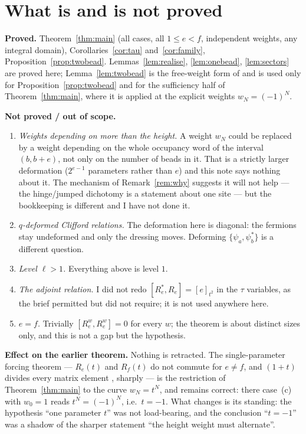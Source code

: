 \documentclass[11pt]{article}
\theoremstyle{definition}
\begin{document}
\section{What is and is not proved}\label{sec:gaps}

\textbf{Proved.}  Theorem~\ref{thm:main} (all cases, all $1\le e<f$, independent weights,
any integral domain), Corollaries~\ref{cor:tau} and~\ref{cor:family},
Proposition~\ref{prop:twobead}.  Lemmas~\ref{lem:realise}, \ref{lem:onebead},
\ref{lem:sectors} are proved here; Lemma~\ref{lem:twobead} is the free-weight form of
\cite[Thm.~5(2)]{Clio0907} and is used only for Proposition~\ref{prop:twobead} and for
the sufficiency half of Theorem~\ref{thm:main}, where it is applied at the explicit
weights $w_N=(-1)^N$.

\textbf{Not proved / out of scope.}
\begin{enumerate}
\item \emph{Weights depending on more than the height.}  A weight $w_{N}$ could be
  replaced by a weight depending on the whole occupancy word of the interval
  $(b,b+e)$, not only on the number of beads in it.  That is a strictly larger
  deformation ($2^{e-1}$ parameters rather than $e$) and this note says nothing about it.
  The mechanism of Remark~\ref{rem:why} suggests it will not help --- the hinge/jumped
  dichotomy is a statement about one site --- but the bookkeeping is different and I have
  not done it.
\item \emph{$q$-deformed Clifford relations.}  The deformation here is diagonal: the
  fermions stay undeformed and only the dressing moves.  Deforming
  $\{\psi_a,\psi_b^{*}\}$ is a different question.
\item \emph{Level $\ell>1$.}  Everything above is level $1$.
\item \emph{The adjoint relation.}  I did not redo $[R_e^{*},R_e]=[e]_{t^2}$ in the
  $\tau$ variables, as the brief permitted but did not require; it is not used anywhere
  here.
\item \emph{$e=f$.}  Trivially $[R_e^w,R_e^w]=0$ for every $w$; the theorem is about
  distinct sizes only, and this is not a gap but the hypothesis.
\end{enumerate}

\textbf{Effect on the earlier theorem.}  Nothing is retracted.  The single-parameter
forcing theorem --- $R_e(t)$ and $R_f(t)$ do not commute for $e\ne f$, and $(1+t)$
divides every matrix element \cite[Cor.~11]{Clio0906}, sharply \cite[Cor.~7]{Clio0907}
--- is the restriction of Theorem~\ref{thm:main} to the curve $w_N=t^N$, and remains
correct: there case~(c) with $w_0=1$ reads $t^N=(-1)^N$, i.e.\ $t=-1$.  What changes is its standing: the hypothesis
``one parameter $t$'' was not load-bearing, and the conclusion ``$t=-1$'' was a shadow of
the sharper statement ``the height weight must alternate''.
\end{document}
